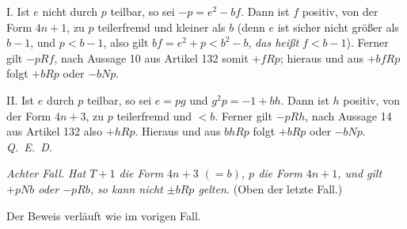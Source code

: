 I. Ist $e$ nicht durch $p$ teilbar, so sei $-p=e^2-bf$. Dann ist $f$ positiv, von der Form $4n+1$, zu $p$ teilerfremd und kleiner als $b$ (denn $e$ ist sicher nicht größer als $b-1$, und $p<b-1$, also gilt $bf=e^2+p<b^2-b$, \textit{das heißt} $f<b-1$). Ferner gilt $-pRf$, nach Aussage 10 aus Artikel 132 somit $+fRp$; hieraus und aus $+bfRp$ folgt $+bRp$ oder $-bNp$.

II. Ist $e$ durch $p$ teilbar, so sei $e=pg$ und $g^2p=-1+bh$. Dann ist $h$ positiv, von der Form $4n+3$, zu $p$ teilerfremd und $<b$. Ferner gilt $-pRh$, nach Aussage 14 aus Artikel 132 also $+hRp$. Hieraus und aus $bhRp$ folgt $+bRp$ oder $-bNp$. \mbox{\textit{Q. E. D.}}

\textit{Achter Fall. Hat $T+1$ die Form $4n+3$ $(=b)$, $p$ die Form $4n+1$, und gilt $+pNb$ oder $-pRb$, so kann nicht $\pm bRp$ gelten.} (Oben der letzte Fall.)

Der Beweis verläuft wie im vorigen Fall.
